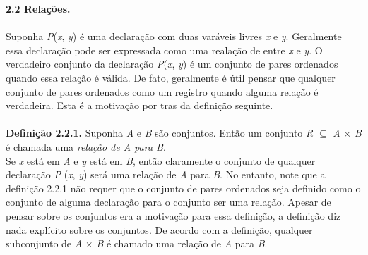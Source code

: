 {\textbf{\large 2.2 Relações.}}
\\
\\

Suponha \textit{P}(\textit{x}, \textit{y}) é uma declaração com duas varáveis livres \textit{x} e \textit{y}. Geralmente essa
declaração pode ser expressada como uma realação de entre \textit{x} e \textit{y}. O verdadeiro conjunto da declaração
\textit{P}(\textit{x}, \textit{y}) é um conjunto de pares ordenados quando essa relação é válida. De fato, geralmente é útil 
pensar que qualquer conjunto de pares ordenados como um registro quando alguma relação é verdadeira. Esta é a motivação por tras
da definição seguinte.
\\
\\

\textbf{Definição 2.2.1.} Suponha \textit{A} e \textit{B} são conjuntos. Então um conjunto \textit{R} $\subseteq$ \textit{A} 
$\times$ \textit{B} é chamada uma \textit{relação de A para B}.
\\
Se \textit{x} está em \textit{A} e \textit{y} está em \textit{B}, então claramente o conjunto de qualquer declaração \textit{P}
(\textit{x}, \textit{y}) será uma relação de \textit{A} para \textit{B}. No entanto, note que a definição 2.2.1 não requer que 
o conjunto de pares ordenados seja definido como o conjunto de alguma declaração para o conjunto ser uma relação. Apesar de pensar
sobre os conjuntos era a motivação para essa definição, a definição diz nada explícito sobre os conjuntos. De acordo com a definição,
qualquer subconjunto de \textit{A} $\times$ \textit{B} é chamado uma relação de \textit{A} para \textit{B}.
\\
\\

